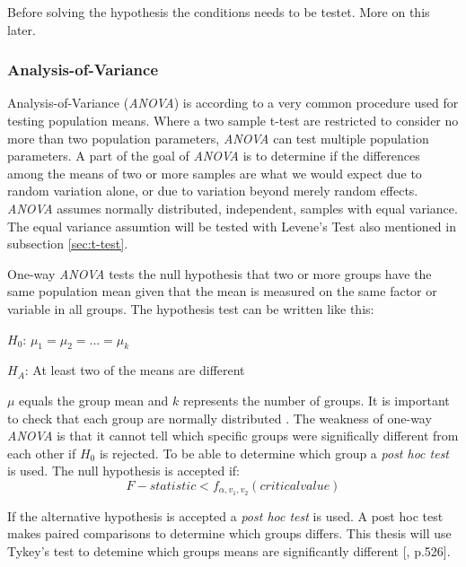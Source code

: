Before solving the hypothesis the conditions needs to be testet. More on this later. %

\subsubsection[ANOVA]{Analysis-of-Variance}\label{sec:anova}
Analysis-of-Variance (\textit{ANOVA}) is according to \cite{Walpole2012} a very common procedure used for testing population means. Where a two sample t-test are restricted to consider no more than two population parameters, \textit{ANOVA} can test multiple population parameters. A part of the goal of \textit{ANOVA} is to determine if the differences among the means of two or more samples are what we would expect due to random variation alone, or due to variation beyond merely random effects. \textit{ANOVA} assumes normally distributed, independent, samples with equal variance. The equal variance assumtion will be tested with Levene's Test also mentioned in subsection \ref{sec:t-test}. 

One-way \textit{ANOVA} tests the null hypothesis that two or more groups have the same population mean given that the mean is measured on the same factor or variable in all groups\citep{LundResearchLtd2013a}. The hypothesis test can be written like this:\newline

\centerline{$H_{0}$:  $\mu_{1} =  \mu_{2} = ... = \mu_{k} $} 
\centerline{$H_{A}$:  At least two of the means are different}

$\mu$ equals the group mean and $k$ represents the number of groups. It is important to check that each group are normally distributed \citep{LundResearchLtd2013a}. The weakness of one-way \textit{ANOVA} is that it cannot tell which specific groups were significally different from each other if $H_{0}$ is rejected. To be able to determine which group a \textit{post hoc test} is used. The null hypothesis is accepted if:\\

\begin{equation}
\label{eq:anova_reject}
F-statistic < f_{\alpha, v_{1}, v_{2}} (critical value)
\end{equation}

If the alternative hypothesis is accepted a \textit{post hoc test} is used. A post hoc test makes paired comparisons to determine which groups differs. This thesis will use Tykey's test to detemine which groups means are significantly different [\citep{Walpole2012}, p.526]. 

